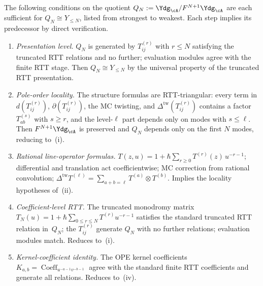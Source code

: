 \begin{proposition}
\label{prop:dg-shifted-rtt-presentation-criterion}
\label{prop:dg-shifted-rtt-locality-criterion}
\label{prop:dg-shifted-rtt-formula-preservation}
\label{prop:dg-shifted-rtt-coefficient-criterion}
\label{prop:dg-shifted-rtt-kernel-coefficient-criterion}
\label{prop:dg-shifted-rtt-oneloop-kernel-criterion}
\label{prop:dg-shifted-rtt-evaluation-detection}
The following conditions on the quotient
$Q_N:=\Ydg_{\cA}/F^{N+1}\Ydg_{\cA}$ are each sufficient for
$Q_N \cong Y_{\le N}$, listed from strongest to weakest.
Each step implies its predecessor by direct verification.
\begin{enumerate}[label=\textup{(\roman*)}]
\item \emph{Presentation level.}
 $Q_N$ is generated by $T_{ij}^{(r)}$ with $r \le N$ satisfying the
 truncated RTT relations and no further; evaluation modules agree with
 the finite RTT stage. Then $Q_N\cong Y_{\le N}$ by the universal
 property of the truncated RTT presentation.

\item \emph{Pole-order locality.}
 The structure formulas are RTT-triangular: every term in
 $d(T_{ij}^{(r)})$, $\partial(T_{ij}^{(r)})$, the MC twisting, and
 $\Delta^{\mathrm{tw}}(T_{ij}^{(r)})$ contains a factor $T_{ab}^{(s)}$
 with $s \ge r$, and the level-$\ell$ part depends only on modes with
 $s \le \ell$. Then $F^{N+1}\Ydg_{\cA}$ is preserved and $Q_N$ depends
 only on the first $N$ modes, reducing to~\textup{(i)}.

\item \emph{Rational line-operator formulas.}
 $T(z,u)=1+\hbar\sum_{r \ge 0} T^{(r)}(z)\,u^{-r-1}$; differential
 and translation act coefficientwise; MC correction from rational
 convolution; $\Delta^{\mathrm{tw}}T^{(\ell)}=\sum_{a+b=\ell}
 T^{(a)}\otimes T^{(b)}$. Implies the locality hypotheses
 of~\textup{(ii)}.

\item \emph{Coefficient-level RTT.}
 The truncated monodromy matrix
 $T_N(u)=1+\hbar\sum_{0\le r\le N}T^{(r)}u^{-r-1}$ satisfies the
 standard truncated RTT relation in~$Q_N$; the $T^{(r)}_{ij}$ generate
 $Q_N$ with no further relations; evaluation modules match.
 Reduces to~\textup{(i)}.

\item \emph{Kernel-coefficient identity.}
 The OPE kernel coefficients
 $K_{a,b}=\operatorname{Coeff}_{u^{-a-1}v^{-b-1}}$ agree with the
 standard finite RTT coefficients and generate all relations.
 Reduces to~\textup{(iv)}.


\end{enumerate}
\end{proposition}
